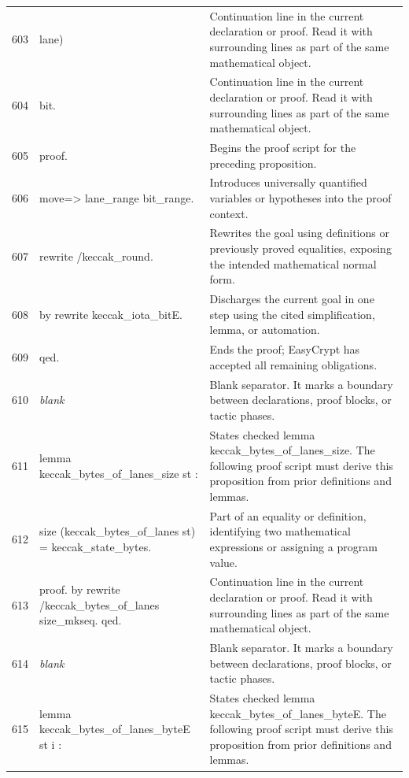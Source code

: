 \documentclass[10pt]{article}
\begin{document}
\begin{longtable}{r L{0.53\textwidth} L{0.37\textwidth}}
603 & {\ttfamily\scriptsize         lane)} & Continuation line in the current declaration or proof.  Read it with surrounding lines as part of the same mathematical object. \\
604 & {\ttfamily\scriptsize       bit.} & Continuation line in the current declaration or proof.  Read it with surrounding lines as part of the same mathematical object. \\
605 & {\ttfamily\scriptsize proof.} & Begins the proof script for the preceding proposition. \\
606 & {\ttfamily\scriptsize move=> lane\_range bit\_range.} & Introduces universally quantified variables or hypotheses into the proof context. \\
607 & {\ttfamily\scriptsize rewrite /keccak\_round.} & Rewrites the goal using definitions or previously proved equalities, exposing the intended mathematical normal form. \\
608 & {\ttfamily\scriptsize by rewrite keccak\_iota\_bitE.} & Discharges the current goal in one step using the cited simplification, lemma, or automation. \\
609 & {\ttfamily\scriptsize qed.} & Ends the proof; EasyCrypt has accepted all remaining obligations. \\
610 & {\ttfamily\scriptsize \emph{blank}} & Blank separator.  It marks a boundary between declarations, proof blocks, or tactic phases. \\
611 & {\ttfamily\scriptsize lemma keccak\_bytes\_of\_lanes\_size st :} & States checked lemma keccak\_bytes\_of\_lanes\_size.  The following proof script must derive this proposition from prior definitions and lemmas. \\
612 & {\ttfamily\scriptsize   size (keccak\_bytes\_of\_lanes st) = keccak\_state\_bytes.} & Part of an equality or definition, identifying two mathematical expressions or assigning a program value. \\
613 & {\ttfamily\scriptsize proof. by rewrite /keccak\_bytes\_of\_lanes size\_mkseq. qed.} & Continuation line in the current declaration or proof.  Read it with surrounding lines as part of the same mathematical object. \\
614 & {\ttfamily\scriptsize \emph{blank}} & Blank separator.  It marks a boundary between declarations, proof blocks, or tactic phases. \\
615 & {\ttfamily\scriptsize lemma keccak\_bytes\_of\_lanes\_byteE st i :} & States checked lemma keccak\_bytes\_of\_lanes\_byteE.  The following proof script must derive this proposition from prior definitions and lemmas. \\

\end{longtable}
\end{document}
